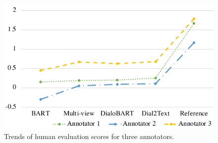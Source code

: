 \documentclass[letterpaper]{article} %
\begin{document}
\begin{figure}
	\centering
	\includegraphics[scale=0.7]{humaneval.pdf}
	\caption{Trends of human evaluation scores for three annotators.}
	\label{fig:humaneval}
\end{figure}


\end{document}
